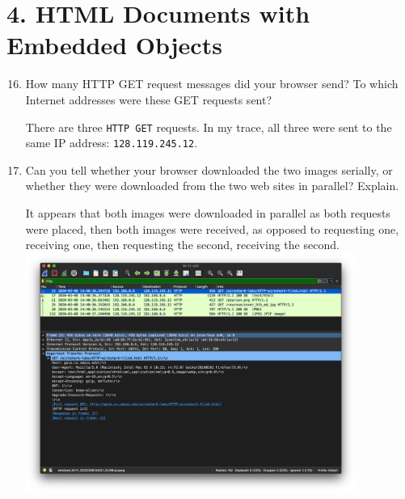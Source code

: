 \documentclass{article}
\begin{document}
\section*{4. HTML Documents with Embedded Objects}
\begin{enumerate}
\setcounter{enumi}{15}
\item How many HTTP GET request messages did your browser send? To which Internet addresses were these GET requests sent?

\textsf{There are three \texttt{HTTP GET} requests. In my trace, all three were sent to the same IP address: \texttt{128.119.245.12}.}

\item Can you tell whether your browser downloaded the two images serially, or whether they were downloaded from the two web sites in parallel? Explain.

\textsf{It appears that both images were downloaded in parallel as both requests were placed, then both images were received, as opposed to requesting one, receiving one, then requesting the second, receiving the second.}
\includegraphics[width=0.85\textwidth]{lab2_part4_get1}

\end{enumerate}
\end{document}
